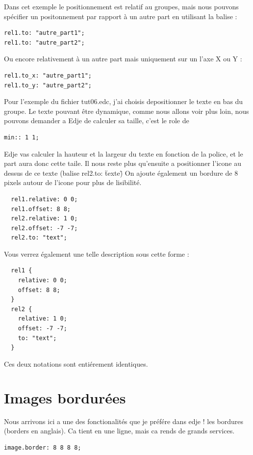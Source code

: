 \documentclass[a4paper]{efr}
\begin{document}
Dans cet exemple le positionnement est relatif au groupes, mais nous pouvons
spécifier un positonnement par rapport à un autre part en utilisant la balise :

\begin{lstlisting}
rel1.to: "autre_part1";
rel1.to: "autre_part2";
\end{lstlisting}

Ou encore relativement à un autre part mais uniquement sur un l'axe X ou Y :
\begin{lstlisting}
rel1.to_x: "autre_part1";
rel1.to_y: "autre_part2";
\end{lstlisting}


Pour l'exemple du fichier tut06.edc, j'ai choisis depositionner le texte en bas
du groupe. Le texte pouvant être dynamique, comme nous allons voir plus loin,
nous pouvons demander a Edje de calculer sa taille, c'est le role de
\begin{lstlisting}
min:: 1 1;
\end{lstlisting}

Edje vas calculer la  hauteur et la largeur du texte en fonction de la police,
et le part aura donc cette taile. Il nous reste plus qu'ensuite a positionner
l'icone au dessus de ce texte (balise rel2.to: \"texte\")
On ajoute également un bordure de 8 pixels autour de l'icone pour plus de
lisibilité.
\begin{lstlisting}
  rel1.relative: 0 0;
  rel1.offset: 8 8;
  rel2.relative: 1 0;
  rel2.offset: -7 -7;
  rel2.to: "text";
\end{lstlisting}

Vous verrez également une telle description sous cette forme :
\begin{lstlisting}
  rel1 {
    relative: 0 0;
    offset: 8 8;
  }
  rel2 {
    relative: 1 0;
    offset: -7 -7;
    to: "text";
  }
\end{lstlisting}

Ces deux notations sont entiérement identiques.

\section{Images bordurées}

Nous arrivons ici a une des fonctionalités que je préfére dans edje ! les
bordures (borders en anglais). Ca tient en une ligne, mais ca rends de grands
services.

\begin{lstlisting}
image.border: 8 8 8 8;
\end{lstlisting}
\end{document}
